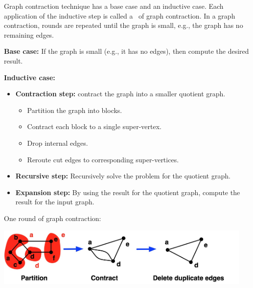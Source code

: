 \begin{flex}
\begin{definition}
\label{def:graphcon::intro::graphcon::technique}

Graph contraction technique has a base case and an inductive case.  
%
Each application of the inductive step is called a~ of
  graph contraction.
%
In a graph contraction, rounds are repeated until the graph is small,
e.g., the graph has no remaining edges.


\textbf{Base case:} If the graph is small (e.g., it has no edges),
then compute the desired result.

\textbf{Inductive case:}
\\
\begin{itemize}
\item \textbf{Contraction step:} contract the graph into a smaller quotient graph.
\begin{itemize}
\item Partition the graph into blocks.
\item Contract each block to a single super-vertex.
\item Drop internal edges.
\item Reroute cut edges to corresponding super-vertices.  
\end{itemize}

\item \textbf{Recursive step:} Recursively solve the problem for the quotient graph.
\item \textbf{Expansion step:} By using the result for the quotient graph, compute the result
  for the input graph.
\end{itemize}
\end{definition}
\begin{example}
\label{ex:graphcon::intro::graphcon::contract-example}

One round of graph contraction:
\begin{center}
  \includegraphics[width=5.0in]{./graph-contraction/media-introduction/contract-example5.jpg}
\end{center}


\end{example}
\end{flex}
